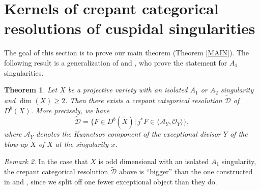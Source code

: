 \documentclass[a4paper, twoside, 11pt]{amsart}
\newtheorem{theorem}{Theorem}[section]
\theoremstyle{definition}
\theoremstyle{remark}
\newtheorem{remark}[theorem]{Remark}
\numberwithin{equation}{theorem}
\newcommand{\dbx}{D^b(X)}
\begin{document}
\section{Kernels of crepant categorical resolutions of cuspidal singularities}\label{constr_crr}
The goal of this section is to prove our main theorem (Theorem \ref{MAIN}). The following result is a generalization of \cite[Proposition 3.5]{Kernels_nodal} and \cite[Theorem 5.8]{categorical_absorptions}, who prove the statement for $A_1$ singularities. 
\begin{theorem}\label{cuspcatres}
	Let $X$ be a projective variety with an isolated $A_1$ or $A_2$ singularity and $\dim(X) \geq 2$. Then there exists a crepant categorical resolution $\widetilde{\mathcal{D}}$ of $\dbx$. More precisely, we have 
    \begin{equation*}
        \widetilde{\mathcal{D}} = \{ F \in D^b(\widetilde{X}) | \ j^*F \in \langle \mathcal{A}_Y, \mathcal{O}_Y \rangle \},
    \end{equation*}
    where $\mathcal{A}_Y$ denotes the Kuznetsov component of the exceptional divisor $Y$ of the blow-up $\widetilde{X}$ of $X$ at the singularity $x$.
\end{theorem}
\begin{remark}
    In the case that $X$ is odd dimensional with an isolated $A_1$ singularity, the crepant categorical resolution $\widetilde{\mathcal{D}}$ above is ``bigger'' than the one constructed in \cite{Kernels_nodal} and \cite{categorical_absorptions}, since we split off one fewer exceptional object than they do.
\end{remark}
\end{document}
